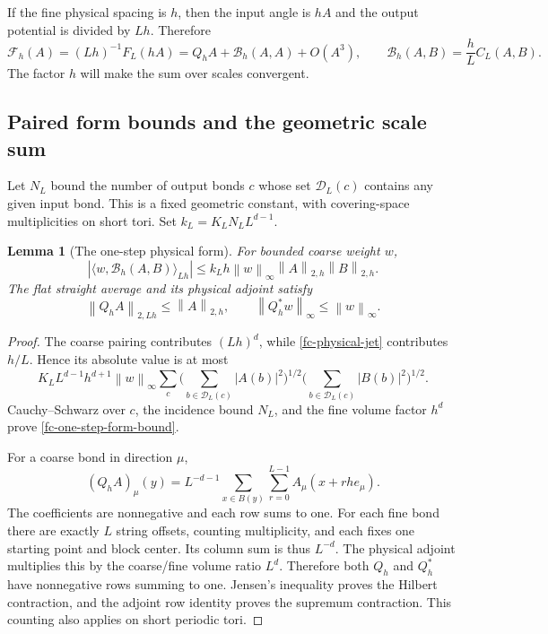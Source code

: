 \documentclass[11pt]{article}
\newtheorem{lemma}[theorem]{Lemma}
\theoremstyle{remark}\newtheorem{remark}[theorem]{Remark}
\newcommand{\norm}[1]{\left\lVert#1\right\rVert}
\begin{document}
If the fine physical spacing is $h$, then the input angle is $hA$
and the output potential is divided by $Lh$. Therefore
\begin{equation}
 \mathcal F_h(A)=(Lh)^{-1}F_L(hA)
    =Q_hA+\mathcal B_h(A,A)+O(A^3),
 \qquad \mathcal B_h(A,B)=\frac hL C_L(A,B).
 \label{fc-physical-jet}
\end{equation}
The factor $h$ will make the sum over scales convergent.

\subsection{Paired form bounds and the geometric scale sum}
\label{fc-geometric-section}

Let $N_L$ bound the number of output bonds $c$ whose set
$\mathcal D_L(c)$ contains any given input bond. This is a fixed
geometric constant, with covering-space multiplicities on short
tori. Set $k_L=K_LN_LL^{d-1}$.

\begin{lemma}[The one-step physical form]
\label{fc-one-step-form}
For bounded coarse weight $w$,
\begin{equation}
 |\langle w,\mathcal B_h(A,B)\rangle_{Lh}|
 \le k_Lh\norm{w}_\infty\norm{A}_{2,h}\norm{B}_{2,h}.
 \label{fc-one-step-form-bound}
\end{equation}
The flat straight average and its physical adjoint satisfy
\begin{equation}
 \norm{Q_hA}_{2,Lh}\le\norm{A}_{2,h},\qquad
 \norm{Q_h^*w}_\infty\le\norm{w}_\infty.
 \label{fc-contractions}
\end{equation}
\end{lemma}

\begin{proof}
The coarse pairing contributes $(Lh)^d$, while
\eqref{fc-physical-jet} contributes $h/L$. Hence its absolute value
is at most
\[
 K_LL^{d-1}h^{d+1}\norm{w}_\infty
 \sum_c
 \Big(\sum_{b\in\mathcal D_L(c)}|A(b)|^2\Big)^{1/2}
 \Big(\sum_{b\in\mathcal D_L(c)}|B(b)|^2\Big)^{1/2}.
\]
Cauchy--Schwarz over $c$, the incidence bound $N_L$, and the fine
volume factor $h^d$ prove \eqref{fc-one-step-form-bound}.

For a coarse bond in direction $\mu$,
\[
 (Q_h A)_\mu(y)=L^{-d-1}\sum_{x\in B(y)}\sum_{r=0}^{L-1}
                         A_\mu(x+rh e_\mu).
\]
The coefficients are nonnegative and each row sums to one. For
each fine bond there are exactly $L$ string offsets, counting
multiplicity, and each fixes one starting point and block center.
Its column sum is thus $L^{-d}$. The physical adjoint multiplies
this by the coarse/fine volume ratio $L^d$. Therefore both $Q_h$
and $Q_h^*$ have nonnegative rows summing to one. Jensen's
inequality proves the Hilbert contraction, and the adjoint row
identity proves the supremum contraction. This counting also
applies on short periodic tori.
\end{proof}
\end{document}
